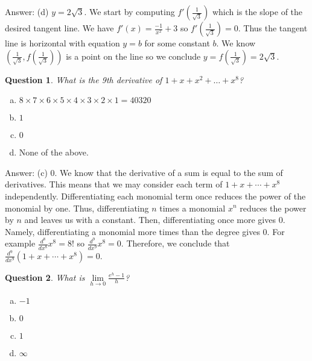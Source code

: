 \documentclass[10pt]{article}
\newtheorem{quiz}{Question}
\begin{document}
\begin{multicols}{2}
\vspace{5mm}

Answer: (d) $y = 2\sqrt{3}$. We start by computing $f'(\frac{1}{\sqrt{3}})$ which is the slope of the desired tangent line. We have $f'(x) = \frac{-1}{x^2} + 3$ so $f'(\frac{1}{\sqrt{3}}) = 0$. Thus the tangent line is horizontal with equation $y = b$ for some constant $b$. We know $(\frac{1}{\sqrt{3}}, f(\frac{1}{\sqrt{3}}))$ is a point on the line so we conclude $y = f(\frac{1}{\sqrt{3}}) = 2\sqrt{3}$.

\vspace{5mm}

\begin{quiz} What is the 9th derivative of $1+x+x^2+\dots+x^8$?
\end{quiz}
\begin {enumerate}[(a)]
\item $8\times 7 \times 6 \times 5 \times 4 \times 3 \times 2 \times 1 = 40320$
\item $1$
\item $0$
\item None of the above.
\end{enumerate}
\vspace{0.5 cm}

Answer: (c) 0. We know that the derivative of a sum is equal to the sum of derivatives. This means that we may consider each term of $1 + x + \cdots + x^8$ independently. Differentiating each monomial term once reduces the power of the monomial by one. Thus, differentiating $n$ times a monomial $x^n$ reduces the power by $n$ and leaves us with a constant. Then, differentiating once more gives 0. Namely, differentiating a monomial more times than the degree gives 0. For example $\frac{d^8}{dx^8}x^8 = 8!$ so $\frac{d^9}{dx^9}x^8 = 0$. Therefore, we conclude that $\frac{d^9}{dx^9}(1 + x + \cdots + x^8) = 0$.  

\vspace{5mm}

\begin{quiz} What is $\lim\limits_{h\to 0} \frac{e^{h} - 1}{h}$?
\end{quiz}
\begin {enumerate}[(a)]
\item $-1$
\item $0$
\item $1$
\item $\infty$
\end{enumerate}

\vspace{0.5 cm}


\end{multicols}
\end{document}
